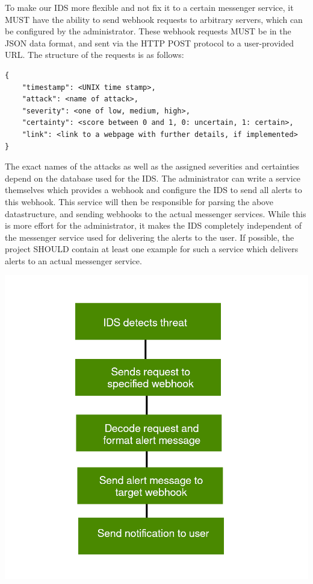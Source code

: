 \documentclass[oneside, english]{reports/assets/sdqtechreport}
\begin{document}
To make our IDS more flexible and not fix it to a certain messenger service, it
MUST have the ability to send webhook requests to arbitrary servers, which can
be configured by the administrator. These webhook requests MUST be in the JSON
data format, and sent via the HTTP POST protocol to a user-provided URL. The
structure of the requests is as follows:

\begin{verbatim}
{
	"timestamp": <UNIX time stamp>,
	"attack": <name of attack>,
	"severity": <one of low, medium, high>,
	"certainty": <score between 0 and 1, 0: uncertain, 1: certain>,
	"link": <link to a webpage with further details, if implemented>
}
\end{verbatim}

The exact names of the attacks as well as the assigned severities and
certainties depend on the database used for the IDS. The administrator can
write a service themselves which provides a webhook and configure the IDS to
send all alerts to this webhook. This service will then be responsible for
parsing the above datastructure, and sending webhooks to the actual messenger
services. While this is more effort for the administrator, it makes the IDS
completely independent of the messenger service used for delivering the alerts
to the user. If possible, the project SHOULD contain at least one example for
such a service which delivers alerts to an actual messenger service.

\begin{center}
	\includegraphics{alert-workflow}
\end{center}
\end{document}
